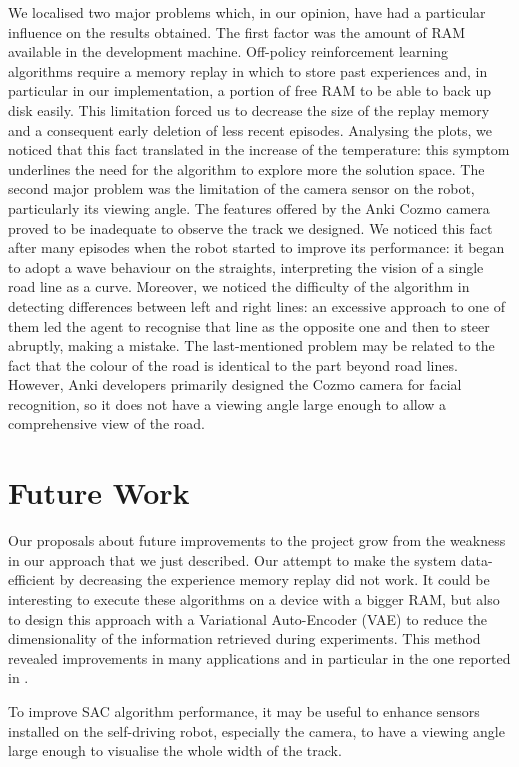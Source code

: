 We localised two major problems which, in our opinion, have had a particular influence on the results obtained.
The first factor was the amount of RAM available in the development machine.
Off-policy reinforcement learning algorithms require a memory replay in which to store past experiences and, in particular in our implementation, a portion of free RAM to be able to back up disk easily. This limitation forced us to decrease the size of the replay memory and a consequent early deletion of less recent episodes. Analysing the plots, we noticed that this fact translated in the increase of the temperature: this symptom underlines the need for the algorithm to explore more the solution space.
The second major problem was the limitation of the camera sensor on the robot, particularly its viewing angle. The features offered by the Anki Cozmo camera proved to be inadequate to observe the track we designed.
We noticed this fact after many episodes when the robot started to improve its performance: it began to adopt a wave behaviour on the straights, interpreting the vision of a single road line as a curve.
Moreover, we noticed the difficulty of the algorithm in detecting differences between left and right lines: an excessive approach to one of them led the agent to recognise that line as the opposite one and then to steer abruptly, making a mistake.
The last-mentioned problem may be related to the fact that the colour of the road is identical to the part beyond road lines.
However, Anki developers primarily designed the Cozmo camera for facial recognition, so it does not have a viewing angle large enough to allow a comprehensive view of the road.


\section{Future Work}

Our proposals about future improvements to the project grow from the weakness in our approach that we just described.
Our attempt to make the system data-efficient by decreasing the experience memory replay did not work. It could be interesting to execute these algorithms on a device with a bigger RAM, but also to design this approach with a Variational Auto-Encoder (VAE) \cite{kingma2013auto} to reduce the dimensionality of the information retrieved during experiments.
This method revealed improvements in many applications and in particular in the one reported in \cite{kendall2018learning,kendall2019learning}.


To improve SAC algorithm performance, it may be useful to enhance sensors installed on the self-driving robot, especially the camera, to have a viewing angle large enough to visualise the whole width of the track.


